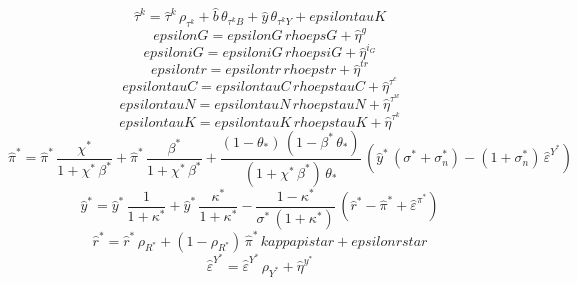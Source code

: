 \begin{dmath}
{\hat{\tau}^k}={\hat{\tau}^k}\, {\rho_{\tau^k}}+{\hat{b}}\, {\theta_{\tau^kB}}+{\hat{y}}\, {\theta_{\tau^kY}}+{epsilontauK}
\end{dmath}
\begin{dmath}
{epsilonG}={epsilonG}\, {rhoepsG}+{\hat{\eta}^{g}}
\end{dmath}
\begin{dmath}
{epsiloniG}={epsiloniG}\, {rhoepsiG}+{\hat{\eta}^{i_G}}
\end{dmath}
\begin{dmath}
{epsilontr}={epsilontr}\, {rhoepstr}+{\hat{\eta}^{tr}}
\end{dmath}
\begin{dmath}
{epsilontauC}={epsilontauC}\, {rhoepstauC}+{\hat{\eta}^{\tau^c}}
\end{dmath}
\begin{dmath}
{epsilontauN}={epsilontauN}\, {rhoepstauN}+{\hat{\eta}^{\tau^w}}
\end{dmath}
\begin{dmath}
{epsilontauK}={epsilontauK}\, {rhoepstauK}+{\hat{\eta}^{\tau^k}}
\end{dmath}
\begin{dmath}
{\hat{\pi}^*}={\hat{\pi}^*}\, \frac{{\chi^*}}{1+{\chi^*}\, {\beta^*}}+{\hat{\pi}^*}\, \frac{{\beta^*}}{1+{\chi^*}\, {\beta^*}}+\frac{\left(1-{\theta_*}\right)\, \left(1-{\beta^*}\, {\theta_*}\right)}{\left(1+{\chi^*}\, {\beta^*}\right)\, {\theta_*}}\, \left({\hat{y}^*}\, \left({\sigma^*}+{\sigma^*_n}\right)-\left(1+{\sigma^*_n}\right)\, {\hat{\varepsilon}^{Y^*}}\right)
\end{dmath}
\begin{dmath}
{\hat{y}^*}={\hat{y}^*}\, \frac{1}{1+{\kappa^*}}+{\hat{y}^*}\, \frac{{\kappa^*}}{1+{\kappa^*}}-\frac{1-{\kappa^*}}{{\sigma^*}\, \left(1+{\kappa^*}\right)}\, \left({\hat{r}^*}-{\hat{\pi}^*}+{\hat{\varepsilon}^{\pi^*}}\right)
\end{dmath}
\begin{dmath}
{\hat{r}^*}={\hat{r}^*}\, {{\rho_{R^*}}}+\left(1-{{\rho_{R^*}}}\right)\, {\hat{\pi}^*}\, {kappapistar}+{epsilonrstar}
\end{dmath}
\begin{dmath}
{\hat{\varepsilon}^{Y^*}}={\hat{\varepsilon}^{Y^*}}\, {{\rho_{Y^*}}}+{\hat{\eta}^{y^*}}
\end{dmath}
